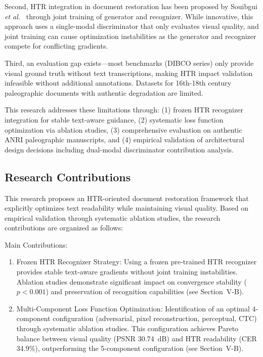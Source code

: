 \documentclass[journal]{IEEEtran}
\begin{document}
Second, HTR integration in document restoration has been proposed by Souibgui \textit{et al.}~\cite{souibgui2021enhance} through joint training of generator and recognizer. While innovative, this approach uses a single-modal discriminator that only evaluates visual quality, and joint training can cause optimization instabilities as the generator and recognizer compete for conflicting gradients.

Third, an evaluation gap exists—most benchmarks (DIBCO series) only provide visual ground truth without text transcriptions, making HTR impact validation infeasible without additional annotations. Datasets for 16th-18th century paleographic documents with authentic degradation are limited.

This research addresses these limitations through: (1) frozen HTR recognizer integration for stable text-aware guidance, (2) systematic loss function optimization via ablation studies, (3) comprehensive evaluation on authentic ANRI paleographic manuscripts, and (4) empirical validation of architectural design decisions including dual-modal discriminator contribution analysis.

\subsection{Research Contributions}

This research proposes an HTR-oriented document restoration framework that explicitly optimizes text readability while maintaining visual quality. Based on empirical validation through systematic ablation studies, the research contributions are organized as follows:

Main Contributions:
\begin{enumerate}
    \item Frozen HTR Recognizer Strategy: Using a frozen pre-trained HTR recognizer provides stable text-aware gradients without joint training instabilities. Ablation studies demonstrate significant impact on convergence stability ($p<0.001$) and preservation of recognition capabilities (see Section~V-B).
    
    \item Multi-Component Loss Function Optimization: Identification of an optimal 4-component configuration (adversarial, pixel reconstruction, perceptual, CTC) through systematic ablation studies. This configuration achieves Pareto balance between visual quality (PSNR 30.74~dB) and HTR readability (CER 34.9\%), outperforming the 5-component configuration (see Section~V-B).
\end{enumerate}
\end{document}
